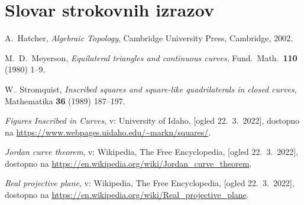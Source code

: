 \documentclass[mat1]{fmfdelo}
\begin{document}
\section*{Slovar strokovnih izrazov}


\begin{thebibliography}{99}

A.~Hatcher, \emph{Algebraic Topology}, Cambridge University Press, Cambridge, 2002.

M.~D.~Meyerson, \emph{Equilateral triangles and continuous curves}, Fund.\ Math.\ \textbf{110} (1980) 1--9.

W.~Stromquist, \emph{Inscribed squares and square-like quadrilaterals in closed curves}, Mathematika \textbf{36} (1989) 187--197.

\emph{Figures Inscribed in Curves}, v: University of Idaho, [ogled 22.~3.~2022], dostopno na \url{https://www.webpages.uidaho.edu/~markn/squares/}.

\emph{Jordan curve theorem}, v: Wikipedia, The Free Encyclopedia, [ogled 22.~3.~2022], dostopno na \url{https://en.wikipedia.org/wiki/Jordan_curve_theorem}.

\emph{Real projective plane}, v: Wikipedia, The Free Encyclopedia, [ogled 22.~3.~2022], dostopno na \url{https://en.wikipedia.org/wiki/Real_projective_plane}.

\end{thebibliography}
\end{document}
